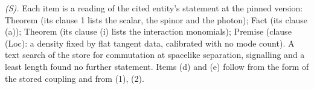 \emph{(S).} Each item is a reading of the cited entity's statement at the pinned version: Theorem  (its clause 1 lists the scalar, the spinor and the photon); Fact  (its clause (a)); Theorem  (its clause (i) lists the interaction monomials); Premise  (clause (Loc): a density fixed by flat tangent data, calibrated with no mode count). A text search of the store for commutation at spacelike separation, signalling and a least length found no further statement. Items (d) and (e) follow from the form of the stored coupling and from (1), (2).
